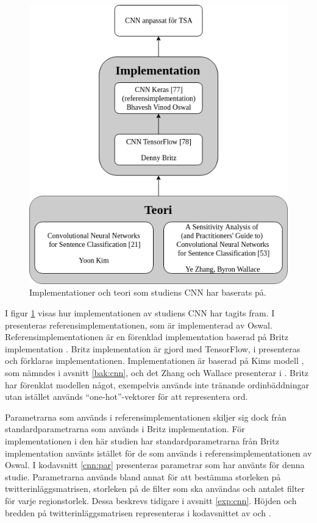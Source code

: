 \documentclass{kaumasters} %
\begin{document}
\begin{figure}[H]
\includegraphics[width=12cm]{cnn_imp}
\centering
\caption{Implementationer och teori som studiens CNN har baserats på.}
\label{fig:cnnimpl}
\end{figure}


I figur \ref{fig:cnnimpl} visas hur implementationen av studiens CNN har tagits fram. 
I \cite{impcnn:003} presenteras referensimplementationen, som är implementerad av Oswal. Referensimplementationen är en förenklad implementation baserad på Britz implementation \cite{impcnn:002}. Britz implementation är gjord med TensorFlow, i \cite{impcnn:001} presenteras och förklaras implementationen. Implementationen är baserad på Kims modell \cite{cnn:003}, som nämndes i avsnitt \ref{bak:cnn}, och det Zhang och Wallace presenterar i \cite{cnn:002}. Britz har förenklat modellen något, exempelvis används inte tränande ordinbäddningar utan istället används “one-hot”-vektorer för att representera ord.

Parametrarna som används i referensimplementationen skiljer sig dock från standardparametrarna som används i Britz implementation. För implementationen i den här studien har standardparametrarna från Britz implementation använts istället för de som används i referensimplementationen av Oswal. I kodavsnitt \ref{cnn:par} presenteras parametrar som har använts för denna studie. Parametrarna används bland annat för att bestämma storleken på twitterinläggsmatrisen, storleken på de filter som ska användas och antalet filter för varje regionstorlek. Dessa beskrevs tidigare i avsnitt \ref{exp:cnn}. Höjden och bredden på twitterinläggsmatrisen representeras i kodavsnittet av  och .
\end{document}
